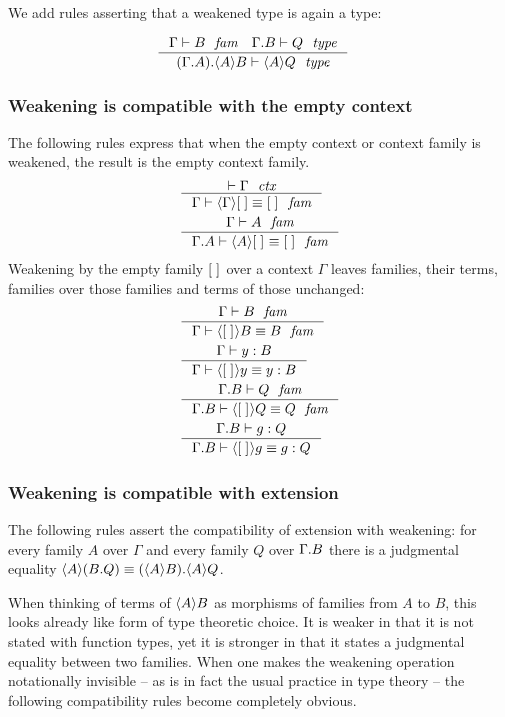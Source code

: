 We add rules asserting that a weakened type is again a type:

\begin{align}
& \inference{\jfam{\Gamma}{B}\quad\jtype{\ctxext{\Gamma}{B}}{Q}}{\jtype{\ctxext{{\Gamma}{A}}{\ctxwk{A}{B}}}{\ctxwk{A}{Q}}}
\end{align}

\subsubsection{Weakening is compatible with the empty context}
The following rules express that when the empty context or context family is
weakened, the result is the empty context family.
\begin{align}
& \inference{\jctx{\Gamma}}{\jfameq{\Gamma}{\ctxwk{\Gamma}{\emptyc}}{\emptyf}}\\
& \inference{\jfam{\Gamma}{A}}{\jfameq{{\Gamma}{A}}{\ctxwk{A}{\emptyf}}{\emptyf}}
\end{align}
Weakening by the empty family ${[\;]}_{}$ over a context $\Gamma$ leaves families, 
their terms, families over those families and
terms of those unchanged:
\begin{align}
& \inference{\jfam{\Gamma}{B}}{\jfameq{\Gamma}{\ctxwk{\emptyf}{B}}{B}}\\
& \inference{\jterm{\Gamma}{B}{y}}{\jtermeq{\Gamma}{B}{\ctxwk{\emptyf}{y}}{y}}\\
& \inference{\jfam{{\Gamma}{B}}{Q}}{\jfameq{{\Gamma}{B}}{\ctxwk{\emptyf}{Q}}{Q}}\\
& \inference{\jterm{{\Gamma}{B}}{Q}{g}}{\jtermeq{{\Gamma}{B}}{Q}{\ctxwk{\emptyf}{g}}{g}}
\end{align}

\subsubsection{Weakening is compatible with extension}\label{comp-we}

The following rules assert the compatibility of extension with weakening: for
every family $A$ over $\Gamma$ and every family $Q$ over $\ctxext{\Gamma}{B}$
there is a
judgmental equality $\ctxwk{A}{\ctxext{B}{Q}}\jdeq\ctxext{\ctxwk{A}{B}}
{\ctxwk{A}{Q}}$. 

When thinking of terms of $\ctxwk{A}{B}$ as morphisms of families from $A$ to
$B$, this looks already like form of type theoretic choice. It is weaker in that
it is not stated with function types, yet it is stronger in that it states a
judgmental equality between two families. When one makes the weakening operation
notationally invisible -- as is in fact the usual practice in type theory -- the
following compatibility rules become completely obvious.


